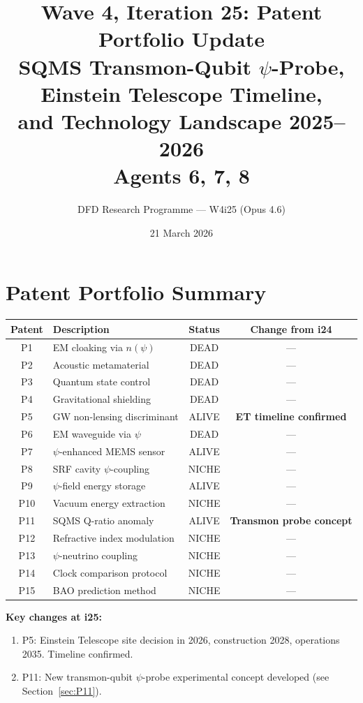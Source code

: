 \documentclass[11pt]{article}
\title{\textbf{Wave 4, Iteration 25: Patent Portfolio Update}\\[12pt]
{\large SQMS Transmon-Qubit $\psi$-Probe, Einstein Telescope Timeline,\\
and Technology Landscape 2025--2026}\\[4pt]
{\large Agents 6, 7, 8}}
\author{DFD Research Programme --- W4i25 (Opus 4.6)}
\date{21 March 2026}
\begin{document}
\maketitle
\tableofcontents
\newpage

\section*{Patent Portfolio Summary}

\begin{tcolorbox}[colback=blue!5!white, colframe=blue!70!black,
  title=\textbf{W4i25 PATENT STATUS OVERVIEW}]

\begin{center}
\begin{tabular}{clcc}
\toprule
\textbf{Patent} & \textbf{Description} & \textbf{Status} & \textbf{Change from i24} \\
\midrule
P1 & EM cloaking via $n(\psi)$ & DEAD & --- \\
P2 & Acoustic metamaterial & DEAD & --- \\
P3 & Quantum state control & DEAD & --- \\
P4 & Gravitational shielding & DEAD & --- \\
P5 & GW non-lensing discriminant & ALIVE & \textbf{ET timeline confirmed} \\
P6 & EM waveguide via $\psi$ & DEAD & --- \\
P7 & $\psi$-enhanced MEMS sensor & ALIVE & --- \\
P8 & SRF cavity $\psi$-coupling & NICHE & --- \\
P9 & $\psi$-field energy storage & ALIVE & --- \\
P10 & Vacuum energy extraction & NICHE & --- \\
P11 & SQMS Q-ratio anomaly & ALIVE & \textbf{Transmon probe concept} \\
P12 & Refractive index modulation & NICHE & --- \\
P13 & $\psi$-neutrino coupling & NICHE & --- \\
P14 & Clock comparison protocol & NICHE & --- \\
P15 & BAO prediction method & NICHE & --- \\
\bottomrule
\end{tabular}
\end{center}

\textbf{Key changes at i25:}
\begin{enumerate}
  \item P5: Einstein Telescope site decision in 2026, construction
    2028, operations 2035. Timeline confirmed.
  \item P11: New transmon-qubit $\psi$-probe experimental concept
    developed (see Section~\ref{sec:P11}).
\end{enumerate}

\end{tcolorbox}
\end{document}
